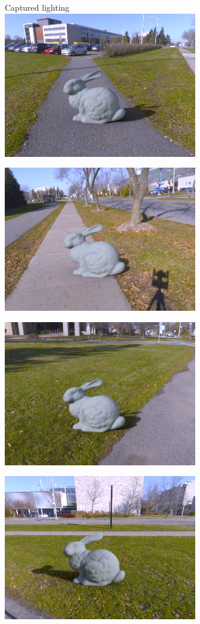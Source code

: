 \begin{minipage}{\linewidth}
\begin{multicols}{4}
\vfill\null
\columnbreak

Captured lighting\\

\includegraphics[width=\mywidth]{AG8A2749_Panorama_hdr-corrected_002.jpg}

\includegraphics[width=\mywidth]{AG8A2791_Panorama_hdr-corrected.jpg}

\includegraphics[width=\mywidth]{AG8A2833_Panorama_hdr-corrected_003.jpg}

\includegraphics[width=\mywidth]{AG8A2833_Panorama_hdr-corrected_002.jpg}



\end{multicols}
\end{minipage}
